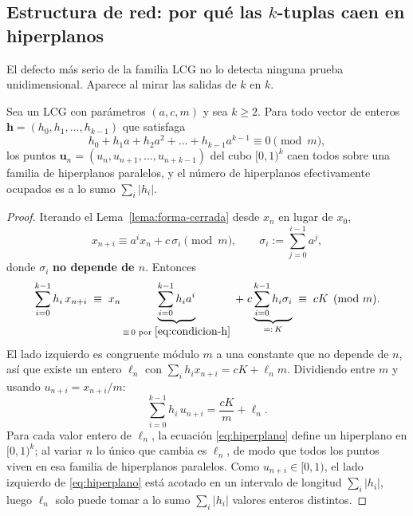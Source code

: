 \subsection{Estructura de red: por qué las $k$-tuplas caen en hiperplanos}
\label{sec:red}

El defecto más serio de la familia LCG no lo detecta ninguna prueba
unidimensional. Aparece al mirar las salidas de $k$ en $k$.

\begin{teorema}
\label{teo:red}
Sea un LCG con parámetros $(a, c, m)$ y sea $k \ge 2$. Para todo vector de
enteros $\mathbf{h} = (h_0, h_1, \dots, h_{k-1})$ que satisfaga
\begin{equation}
  h_0 + h_1 a + h_2 a^2 + \dots + h_{k-1} a^{k-1} \equiv 0 \pmod{m},
  \label{eq:condicion-h}
\end{equation}
los puntos $\mathbf{u}_n = (u_n, u_{n+1}, \dots, u_{n+k-1})$ del cubo $[0,1)^k$
caen todos sobre una familia de hiperplanos paralelos, y el número de
hiperplanos efectivamente ocupados es a lo sumo $\sum_{i} |h_i|$.
\end{teorema}

\begin{proof}
Iterando el Lema~\ref{lema:forma-cerrada} desde $x_n$ en lugar de $x_0$,
\[
  x_{n+i} \equiv a^{i} x_n + c\, \sigma_i \pmod m ,
  \qquad
  \sigma_i := \sum_{j=0}^{i-1} a^{j} ,
\]
donde $\sigma_i$ \textbf{no depende de $n$}. Entonces
\[
  \sum_{i=0}^{k-1} h_i\, x_{n+i}
  \;\equiv\; x_n \underbrace{\sum_{i=0}^{k-1} h_i a^{i}}_{\equiv\, 0 \text{ por } \eqref{eq:condicion-h}}
  \;+\; c \underbrace{\sum_{i=0}^{k-1} h_i \sigma_i}_{=:\,K}
  \;\equiv\; cK \pmod m .
\]
El lado izquierdo es congruente módulo $m$ a una constante que no depende de
$n$, así que existe un entero $\ell_n$ con
$\sum_i h_i x_{n+i} = cK + \ell_n m$. Dividiendo entre $m$ y usando
$u_{n+i} = x_{n+i}/m$:
\begin{equation}
  \sum_{i=0}^{k-1} h_i\, u_{n+i} = \frac{cK}{m} + \ell_n .
  \label{eq:hiperplano}
\end{equation}
Para cada valor entero de $\ell_n$, la ecuación \eqref{eq:hiperplano} define un
hiperplano en $[0,1)^k$; al variar $n$ lo único que cambia es $\ell_n$, de modo
que todos los puntos viven en esa familia de hiperplanos paralelos. Como
$u_{n+i} \in [0,1)$, el lado izquierdo de \eqref{eq:hiperplano} está acotado en
un intervalo de longitud $\sum_i |h_i|$, luego $\ell_n$ solo puede tomar a lo
sumo $\sum_i |h_i|$ valores enteros distintos.
\end{proof}

